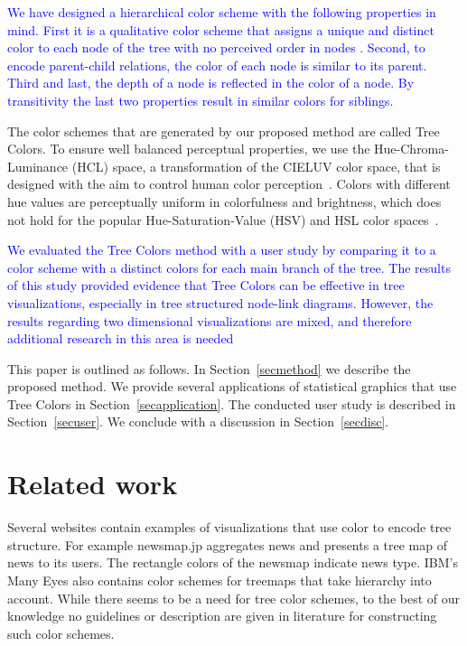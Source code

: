 \documentclass[journal]{vgtc}                %
\newcommand{\changedE}[1]{\textcolor{cornellred}{#1}}
\newcommand{\changedM}[1]{\textcolor{blue}{#1}}
\begin{document}
\changedM{We have designed a hierarchical color scheme with the following properties in mind. First it is a qualitative color scheme that assigns a unique and distinct color to each node of the tree with no perceived order in nodes \cite{brewer03, zeileis2009}. Second, to encode parent-child relations, the color of each node is similar to its parent. Third and last, the depth of a node is reflected in the color of a node. By transitivity the last two properties result in similar colors for siblings.}

The color schemes that are generated by our proposed method are called Tree Colors. To ensure well
balanced perceptual properties, we use the Hue-Chroma-Luminance (HCL) space, a transformation of the CIELUV color space, that is designed with the aim to control human color perception~\cite{ihaka2003}. Colors with different hue values are perceptually uniform in colorfulness and brightness, which does not hold for the popular Hue-Saturation-Value (HSV) and HSL color spaces~\cite{zeileis2009}.

\changedM{We evaluated the Tree Colors method with a user study by comparing it to a color scheme with a distinct colors for each main branch of the tree. The results of this study provided evidence that Tree Colors can be effective in tree visualizations, especially in tree structured node-link diagrams. However, the results regarding two dimensional visualizations are mixed, and therefore additional research in this area is needed}

This paper is outlined as follows. In Section~\ref{secmethod} we describe the proposed method. We provide several applications of statistical graphics that use Tree Colors in Section~\ref{secapplication}. The conducted user study is described in Section~\ref{secuser}. We conclude with a discussion in Section~\ref{secdisc}.

\section{Related work}
\changedE{
Several websites contain examples of visualizations that use color to encode tree structure. For example newsmap.jp 
\cite{newsmap} aggregates news and presents a tree map of news to its users. The rectangle colors of the newsmap 
indicate news type. IBM's Many Eyes \cite{manyeyes} also contains color schemes for treemaps that take hierarchy 
into account. While there seems to be a need for tree color schemes, to the best of our knowledge no guidelines or 
description are given in literature for constructing such color schemes.
}
\end{document}
